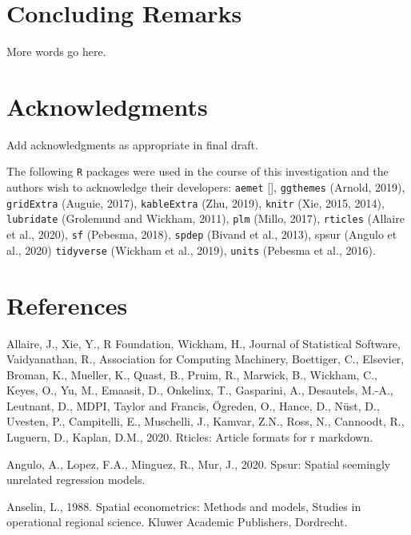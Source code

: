 \documentclass[]{elsarticle} %
\begin{document}
\hypertarget{concluding-remarks}{%
\section{Concluding Remarks}\label{concluding-remarks}}

More words go here.

\hypertarget{acknowledgments}{%
\section*{Acknowledgments}\label{acknowledgments}}

Add acknowledgments as appropriate in final draft.

The following \texttt{R} packages were used in the course of this
investigation and the authors wish to acknowledge their developers:
\texttt{aemet} {[}{]}, \texttt{ggthemes} (Arnold, 2019),
\texttt{gridExtra} (Auguie, 2017), \texttt{kableExtra} (Zhu, 2019),
\texttt{knitr} (Xie, 2015, 2014), \texttt{lubridate} (Grolemund and
Wickham, 2011), \texttt{plm} (Millo, 2017), \texttt{rticles} (Allaire et
al., 2020), \texttt{sf} (Pebesma, 2018), \texttt{spdep} (Bivand et al.,
2013), spsur (Angulo et al., 2020) \texttt{tidyverse} (Wickham et al.,
2019), \texttt{units} (Pebesma et al., 2016).

\hypertarget{references}{%
\section*{References}\label{references}}

\hypertarget{refs}{}
\leavevmode\hypertarget{ref-Allaire2020}{}%
Allaire, J., Xie, Y., R Foundation, Wickham, H., Journal of Statistical
Software, Vaidyanathan, R., Association for Computing Machinery,
Boettiger, C., Elsevier, Broman, K., Mueller, K., Quast, B., Pruim, R.,
Marwick, B., Wickham, C., Keyes, O., Yu, M., Emaasit, D., Onkelinx, T.,
Gasparini, A., Desautels, M.-A., Leutnant, D., MDPI, Taylor and Francis,
Ögreden, O., Hance, D., Nüst, D., Uvesten, P., Campitelli, E.,
Muschelli, J., Kamvar, Z.N., Ross, N., Cannoodt, R., Luguern, D.,
Kaplan, D.M., 2020. Rticles: Article formats for r markdown.

\leavevmode\hypertarget{ref-Angulo2020spsur}{}%
Angulo, A., Lopez, F.A., Minguez, R., Mur, J., 2020. Spsur: Spatial
seemingly unrelated regression models.

\leavevmode\hypertarget{ref-Anselin1988spatial}{}%
Anselin, L., 1988. Spatial econometrics: Methods and models, Studies in
operational regional science. Kluwer Academic Publishers, Dordrecht.
\end{document}
